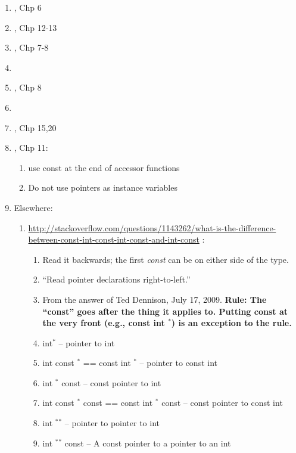 \begin{enumerate}
\begin{enumerate}
	\item \cite{Lippman2013}, Chp 6
	\item \cite{Allain2012}, Chp 12-13
	\item \cite{Prata2012}, Chp 7-8
	\item \cite[Chp. 4--5; \S11.1; and Chp. 14]{Savitch2009}
	\item \cite{Stroustrup2009}, Chp 8
	\item \cite[Chp. 7--8, pp. 279--391]{Prata2005}
	\item \cite{Oualline2003}, Chp 15,20
	\item \cite{Eckel2000}, Chp 11: \vspace{-0.2cm}
		\begin{enumerate} \itemsep -2pt
		\item use const at the end of accessor functions
		\item Do not use pointers as instance variables
		\end{enumerate}
	\item Elsewhere: \vspace{-0.2cm}
		\begin{enumerate} \itemsep -2pt
		\item \url{http://stackoverflow.com/questions/1143262/what-is-the-difference-between-const-int-const-int-const-and-int-const} \cite{Mortensen2015}: \vspace{-0.1cm}
			\begin{enumerate} \itemsep -1pt
			\item Read it backwards; the first {\it const} can be on either side of the type.
			\item ``Read pointer declarations right-to-left.''
			\item From the answer of Ted Dennison, July 17, 2009. {\bf Rule: The ``const'' goes after the thing it applies to. Putting const at the very front (e.g., const int $^{\ast}$) is an exception to the rule.}
			\item int$^{\ast}$ -- pointer to int
			\item int const $^{\ast}$ == const int $^{\ast}$ -- pointer to const int
			\item int $^{\ast}$ const -- const pointer to int
			\item int const $^{\ast}$ const == const int $^{\ast}$ const -- const pointer to const int
			\item int $^{\ast}$$^{\ast}$ -- pointer to pointer to int
			\item int $^{\ast}$$^{\ast}$ const -- A const pointer to a pointer to an int

\end{enumerate}
\end{enumerate}
\end{enumerate}
\end{enumerate}
